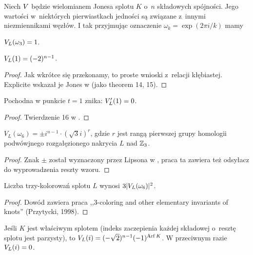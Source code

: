Niech $V$ będzie wielomianem Jonesa splotu $K$ o~$n$ składowych spójności.
Jego wartości w~niektórych pierwiastkach jedności są związane z~innymi niezmiennikami węzłów.
I tak przyjmując oznaczenie $\omega_k = \exp(2\pi i/k)$ mamy

\begin{proposition} \label{jones_sharp_p_hard}
    $V_L(\omega_3) = 1$.
\end{proposition}

\begin{proposition}
    $V_L(1) = (-2)^{n-1}$.
\end{proposition}

\begin{proof}
    Jak wkrótce się przekonamy, to proste wnioski z~relacji kłębiastej.
    Explicite wskazał je Jones w \cite{jones85} (jako theorem 14, 15).
\end{proof}

\begin{proposition}
    Pochodna w punkcie $t = 1$ znika: $V'_L(1) = 0$.
\end{proposition}

\begin{proof}
    Twierdzenie 16 w \cite{jones85}.
\end{proof}

\begin{proposition}
    $V_L(\omega_6) = \pm i^{n-1} \cdot (\sqrt 3i)^r$, gdzie $r$ jest rangą pierwszej grupy homologii podwówjnego rozgałęzionego nakrycia $L$ nad $\mathbb Z_3$.
\end{proposition}

\begin{proof}
    Znak $\pm$ został wyznaczony przez Lipsona w \cite{lipson86}, praca ta zawiera też odsyłacz do wyprowadzenia reszty wzoru.
\end{proof}

\begin{proposition}
    Liczba trzy-kolorowań splotu $L$ wynosi $3|V_L(\omega_6)|^2$.
\end{proposition}

\begin{proof}
    Dowód zawiera praca ,,3-coloring and other elementary invariants of knots'' (Przytycki, 1998).
\end{proof}

\begin{proposition}
    Jeśli $K$ jest właściwym splotem (indeks zaczepienia każdej składowej o~resztę splotu jest parzysty), to $V_L(i) = (-\sqrt 2)^{n-1}(-1)^{\operatorname{Arf} K}$.
    W przeciwnym razie $V_L(i) = 0$.
\end{proposition}

